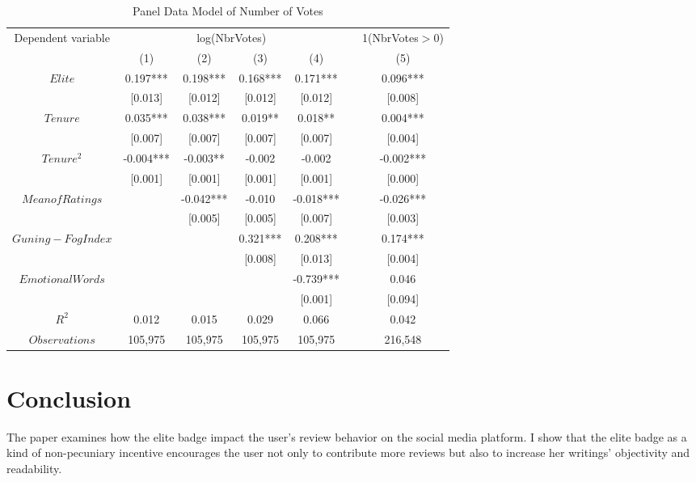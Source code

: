 \documentclass[12pt]{article}%
\newcommand{\ra}[1]{\renewcommand{\arraystretch}{#1}}
\begin{document}
\begin{table*}[htbp]\centering
\ra{1.3}
\renewcommand\thetable{6}
  \caption{Panel Data Model of Number of Votes  \label{PrePoIr} } 
\begin{tabular}{@{}ccccccc@{}}

\toprule[1.5pt]
Dependent variable & \multicolumn{4}{c}{log(NbrVotes)} & \phantom{abc}& \multicolumn{1}{c}{1(NbrVotes$>$0)} \\ 
\cmidrule{2-5} \cmidrule{7-7} 
& (1) & (2) & (3) & (4)&& (5)  \\ \midrule
$Elite$ & 0.197*** & 0.198*** & 0.168*** & 0.171*** && 0.096***  \\
	 & [0.013]& [0.012]& [0.012] &[0.012] && [0.008]\\
$Tenure$ &0.035*** & 0.038***& 0.019** & 0.018** && 0.004***\\
	 & [0.007]& [0.007]& [0.007] & [0.007] && [0.004]\\
$Tenure^2$ & -0.004***& -0.003**&-0.002 & -0.002 && -0.002***\\
	 & [0.001]& [0.001]& [0.001] & [0.001]&& [0.000]\\
$Mean of Ratings$ & &-0.042*** &-0.010 & -0.018*** &&-0.026*** \\
	& &[0.005] & [0.005] &[0.007] && [0.003]\\
$Guning-Fog Index$ & & & 0.321*** &0.208*** &&0.174***\\
	&　& &[0.008] &[0.013] &&[0.004]\\
$Emotional Words$ & & & & -0.739*** &&0.046\\
	&　& & &[0.001] &&[0.094]\\
$R^2$ &0.012 &0.015 &0.029 &0.066 &&0.042\\
$Observations$ &105,975 &105,975 &105,975 &105,975 &&216,548\\
\bottomrule
\end{tabular}

\end{table*}

\section{Conclusion}
\label{conclusion}

The paper examines how the elite badge impact the user's review behavior on the social media platform. I show that the elite badge as a kind of non-pecuniary incentive encourages the user not only to contribute more reviews but also to increase her writings' objectivity and readability. 
\end{document}
